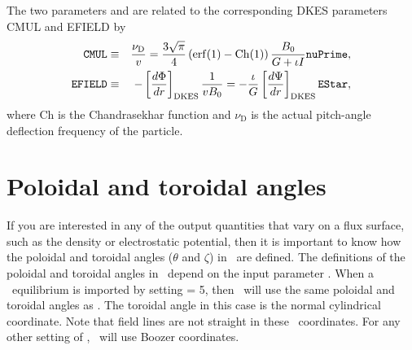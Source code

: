 The two parameters  and  are
related to the corresponding DKES parameters {\ttfamily CMUL} and
{\ttfamily EFIELD} by
\begin{eqnarray}
  \mbox{\ttfamily
    CMUL}&\equiv&\frac{\nu_\mathrm{D}}{v}=\frac{3\sqrt{\pi}}{4}\left(\mathrm{erf}(1)-\mathrm{Ch}(1)\right)
  \frac{B_0}{G+\iota I}\mbox{\ttfamily nuPrime},\\
  \mbox{\ttfamily EFIELD}&\equiv&-\left[\frac{d\Phi}{dr}\right]_\mathrm{DKES}\frac{1}{vB_0}=-\frac{\iota}{G}\left[\frac{d\Psi}{dr}\right]_\mathrm{DKES}\mbox{\ttfamily EStar},
\end{eqnarray}
where $\mathrm{Ch}$ is the Chandrasekhar function and $\nu_\mathrm{D}$
is the actual pitch-angle deflection frequency of the particle.

\section{Poloidal and toroidal angles}

If you are interested in any of the output quantities that vary on a flux surface,
such as the density or electrostatic potential, then it is important to know
how the poloidal and toroidal angles ($\theta$ and $\zeta$) in \sfincs~are defined.
The definitions of the poloidal and toroidal angles in 
\sfincs~depend on the input parameter . When a \vmec~equilibrium is imported by setting
 = 5, then \sfincs~will use the same poloidal and toroidal angles
as \vmec.  The toroidal angle in this case is the normal cylindrical coordinate. Note that field lines
are not straight in these \vmec~coordinates.
For any other setting of , \sfincs~will use Boozer coordinates.

